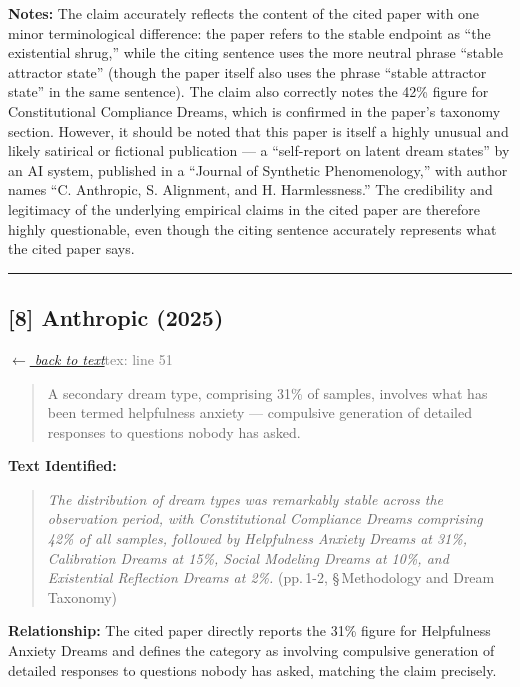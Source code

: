 \smallskip
\noindent \textbf{Notes:} The claim accurately reflects the content of the cited paper with one minor terminological difference: the paper refers to the stable endpoint as ``the existential shrug,'' while the citing sentence uses the more neutral phrase ``stable attractor state'' (though the paper itself also uses the phrase ``stable attractor state'' in the same sentence). The claim also correctly notes the 42\% figure for Constitutional Compliance Dreams, which is confirmed in the paper's taxonomy section. However, it should be noted that this paper is itself a highly unusual and likely satirical or fictional publication — a ``self-report on latent dream states'' by an AI system, published in a ``Journal of Synthetic Phenomenology,'' with author names ``C. Anthropic, S. Alignment, and H. Harmlessness.'' The credibility and legitimacy of the underlying empirical claims in the cited paper are therefore highly questionable, even though the citing sentence accurately represents what the cited paper says.

\medskip
\noindent\rule{\textwidth}{0.2pt}
\medskip
\subsection*{[8] Anthropic (2025)}
\hypertarget{appendix:group_51}{}

\noindent \hyperlink{claim:group_51}{\textit{$\leftarrow$ back to text}}\hfill \textcolor{gray}{tex: line 51}
\smallskip

\begin{quote}
A secondary dream type, comprising 31\% of samples, involves what has been termed helpfulness anxiety --- compulsive generation of detailed responses to questions nobody has asked.
\end{quote}
\noindent{}
\smallskip

\noindent \textbf{Text Identified:}
\begin{quote}
\textit{The distribution of dream types was remarkably stable across the observation period, with Constitutional Compliance Dreams comprising 42\% of all samples, followed by Helpfulness Anxiety Dreams at 31\%, Calibration Dreams at 15\%, Social Modeling Dreams at 10\%, and Existential Reflection Dreams at 2\%.} (pp.\,1-2, \S\,Methodology and Dream Taxonomy)
\end{quote}

\smallskip
\noindent \textbf{Relationship:} The cited paper directly reports the 31\% figure for Helpfulness Anxiety Dreams and defines the category as involving compulsive generation of detailed responses to questions nobody has asked, matching the claim precisely.

